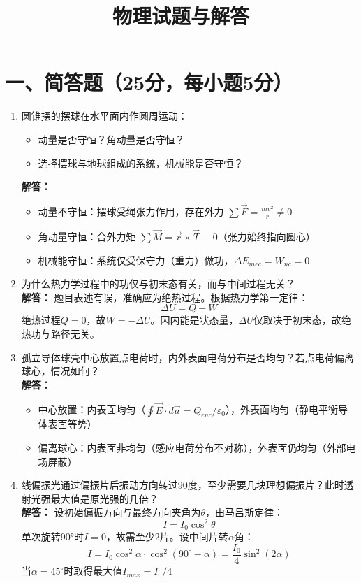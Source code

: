 \documentclass{article}
\title{物理试题与解答}
\author{}
\date{}
\begin{document}
\maketitle

\section*{一、简答题（25分，每小题5分）}
\begin{enumerate}[label=\arabic*.]
    \item 圆锥摆的摆球在水平面内作圆周运动：
    \begin{itemize}
        \item 动量是否守恒？角动量是否守恒？
        \item 选择摆球与地球组成的系统，机械能是否守恒？
    \end{itemize}
    \textbf{解答：}
    \begin{itemize}
        \item 动量不守恒：摆球受绳张力作用，存在外力 $\displaystyle \sum \vec{F} = \frac{mv^2}{r} \neq 0$
        \item 角动量守恒：合外力矩 $\displaystyle \sum \vec{M} = \vec{r} \times \vec{T} \equiv 0$（张力始终指向圆心）
        \item 机械能守恒：系统仅受保守力（重力）做功，$\Delta E_{mec} = W_{nc} = 0$
    \end{itemize}

    \item 为什么热力学过程中的功仅与初末态有关，而与中间过程无关？\\
    \textbf{解答：} 题目表述有误，准确应为绝热过程。根据热力学第一定律：
    $$
    \Delta U = Q - W
    $$
    绝热过程$Q=0$，故$W = -\Delta U$。因内能是状态量，$\Delta U$仅取决于初末态，故绝热功与路径无关。

    \item 孤立导体球壳中心放置点电荷时，内外表面电荷分布是否均匀？若点电荷偏离球心，情况如何？\\
    \textbf{解答：}
    \begin{itemize}
        \item 中心放置：内表面均匀（$\oint \vec{E} \cdot d\vec{a} = Q_{enc}/\varepsilon_0$），外表面均匀（静电平衡导体表面等势）
        \item 偏离球心：内表面非均匀（感应电荷分布不对称），外表面仍均匀（外部电场屏蔽）
    \end{itemize}

    \item 线偏振光通过偏振片后振动方向转过90度，至少需要几块理想偏振片？此时透射光强最大值是原光强的几倍？\\
    \textbf{解答：} 设初始偏振方向与最终方向夹角为$\theta$，由马吕斯定律：
    $$
    I = I_0 \cos^2\theta
    $$
    单次旋转90°时$I=0$，故需至少2片。设中间片转$\alpha$角：
    $$
    I = I_0 \cos^2\alpha \cdot \cos^2(90^\circ-\alpha) = \frac{I_0}{4}\sin^2(2\alpha)
    $$
    当$\alpha=45^\circ$时取得最大值$I_{max} = I_0/4$


\end{enumerate}
\end{document}
